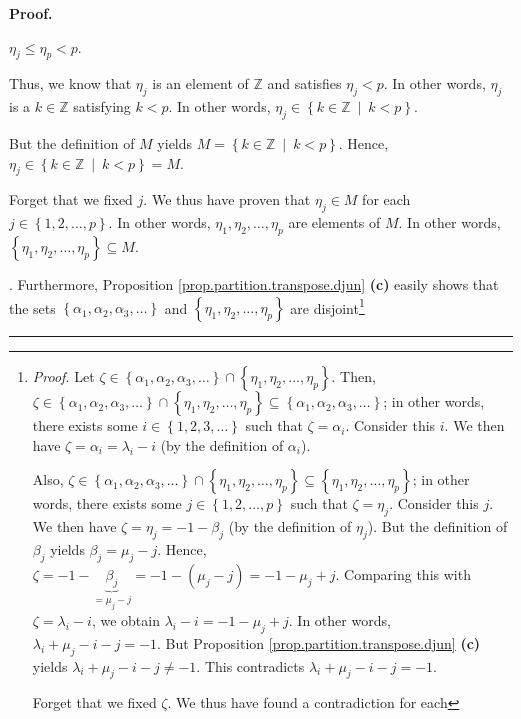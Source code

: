 \documentclass[numbers=enddot,12pt,final,onecolumn,notitlepage]{scrartcl}%
\theoremstyle{definition}
\newenvironment{proof}[1][Proof]{\noindent\textbf{#1.} }{\ \rule{0.5em}{0.5em}}
\newenvironment{verlong}{}{}
\begin{document}
\begin{verlong}
\begin{proof}
{$\eta_{j}\leq\eta_{p}<p$.
\par
Thus, we know that $\eta_{j}$ is an element of $\mathbb{Z}$ and satisfies
$\eta_{j}<p$. In other words, $\eta_{j}$ is a $k\in\mathbb{Z}$ satisfying
$k<p$. In other words, $\eta_{j}\in\left\{  k\in\mathbb{Z}\ \mid\ k<p\right\}
$.
\par
But the definition of $M$ yields $M=\left\{  k\in\mathbb{Z}\ \mid
\ k<p\right\}  $. Hence, $\eta_{j}\in\left\{  k\in\mathbb{Z}\ \mid
\ k<p\right\}  =M$.
\par
Forget that we fixed $j$. We thus have proven that $\eta_{j}\in M$ for each
$j\in\left\{  1,2,\ldots,p\right\}  $. In other words, $\eta_{1},\eta
_{2},\ldots,\eta_{p}$ are elements of $M$. In other words, $\left\{  \eta
_{1},\eta_{2},\ldots,\eta_{p}\right\}  \subseteq M$.}. Furthermore,
Proposition \ref{prop.partition.transpose.djun} \textbf{(c)} easily shows that
the sets $\left\{  \alpha_{1},\alpha_{2},\alpha_{3},\ldots\right\}  $ and
$\left\{  \eta_{1},\eta_{2},\ldots,\eta_{p}\right\}  $ are
disjoint\footnote{\textit{Proof.} Let $\zeta\in\left\{  \alpha_{1},\alpha
_{2},\alpha_{3},\ldots\right\}  \cap\left\{  \eta_{1},\eta_{2},\ldots,\eta
_{p}\right\}  $. Then, $\zeta\in\left\{  \alpha_{1},\alpha_{2},\alpha
_{3},\ldots\right\}  \cap\left\{  \eta_{1},\eta_{2},\ldots,\eta_{p}\right\}
\subseteq\left\{  \alpha_{1},\alpha_{2},\alpha_{3},\ldots\right\}  $; in other
words, there exists some $i\in\left\{  1,2,3,\ldots\right\}  $ such that
$\zeta=\alpha_{i}$. Consider this $i$. We then have $\zeta=\alpha_{i}%
=\lambda_{i}-i$ (by the definition of $\alpha_{i}$).
\par
Also, $\zeta\in\left\{  \alpha_{1},\alpha_{2},\alpha_{3},\ldots\right\}
\cap\left\{  \eta_{1},\eta_{2},\ldots,\eta_{p}\right\}  \subseteq\left\{
\eta_{1},\eta_{2},\ldots,\eta_{p}\right\}  $; in other words, there exists
some $j\in\left\{  1,2,\ldots,p\right\}  $ such that $\zeta=\eta_{j}$.
Consider this $j$. We then have $\zeta=\eta_{j}=-1-\beta_{j}$ (by the
definition of $\eta_{j}$). But the definition of $\beta_{j}$ yields $\beta
_{j}=\mu_{j}-j$. Hence, $\zeta=-1-\underbrace{\beta_{j}}_{=\mu_{j}%
-j}=-1-\left(  \mu_{j}-j\right)  =-1-\mu_{j}+j$. Comparing this with
$\zeta=\lambda_{i}-i$, we obtain $\lambda_{i}-i=-1-\mu_{j}+j$. In other words,
$\lambda_{i}+\mu_{j}-i-j=-1$. But Proposition
\ref{prop.partition.transpose.djun} \textbf{(c)} yields $\lambda_{i}+\mu
_{j}-i-j\neq-1$. This contradicts $\lambda_{i}+\mu_{j}-i-j=-1$.
\par
Forget that we fixed $\zeta$. We thus have found a contradiction for each
}
\end{proof}
\end{verlong}
\end{document}
